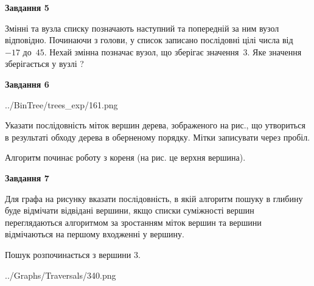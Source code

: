 \documentclass[12pt, ukrainian]{article}
\begin{document}
{\begin {large}
{\begin {center}\textbf{Завдання 5}\end {center}}\par
Змінні  та  вузла списку позначають наступний та попередній за ним вузол відповідно. Починаючи з голови, у список записано послідовні цілі числа від~$-17$ до~$45$. Нехай змінна  позначає вузол, що зберігає значення~$3$.
Яке значення зберігається у вузлі  ?\par
\newpage

{\begin {center}\textbf{Завдання 6}\end {center}}\par

\begin{center}
	{../BinTree/trees_exp/161.png}
\end{center}
Указати послідовність міток вершин дерева, зображеного на рис., що утвориться в результаті обходу дерева в оберненому порядку. Мітки записувати через пробіл.\par Алгоритм починає роботу з кореня (на рис. це верхня вершина).\par
\newpage

{\begin {center}\textbf{Завдання 7}\end {center}}\par
Для графа на рисунку вказати послідовність, в якій алгоритм пошуку в глибину буде відмічати відвідані вершини, якщо списки суміжності вершин переглядаються алгоритмом за зростанням міток вершин та вершини відмічаються на першому вход\-женні у вершину.\par
Пошук розпочинається з вершини 3.\par

\begin{center}
	{../Graphs/Traversals/340.png}
\end{center}\par
\newpage


\end{large}}
\end{document}
